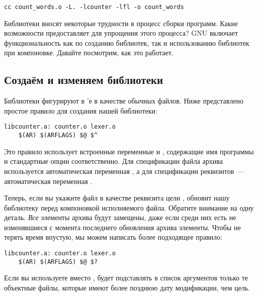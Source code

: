 {\footnotesize
\begin{verbatim}
cc count_words.o -L. -lcounter -lfl -o count_words
\end{verbatim}
}

Библиотеки вносят некоторые трудности в процесс сборки программ. Какие
возможности предоставляет \GNUmake{} для упрощения этого процесса? GNU
\GNUmake{} включает функциональность как по созданию библиотек, так и
использованию библиотек при компоновке. Давайте посмотрим, как это
работает.

\subsection{Создаём и изменяем библиотеки}

Библиотеки фигурируют в \Makefile{}'е в качестве обычных файлов. Ниже
представлено простое правило для создания нашей библиотеки:

{\footnotesize
\begin{verbatim}
libcounter.a: counter.o lexer.o
    $(AR) $(ARFLAGS) $@ $^
\end{verbatim}
}

Это правило использует встроенные переменные  и
, содержащие имя программы  и
стандартные опции  соответственно. Для спецификации файла
архива используется автоматическая переменная , а для
спецификации реквизитов~--- автоматическая переменная \variable{\$\^}.

Теперь, если вы укажите файл  в качестве
реквизита цели , \GNUmake{} обновит нашу
библиотеку перед компоновкой исполняемого файла. Обратите внимание на
одну деталь. \emph{Все} элементы архива будут замещены, даже если
среди них есть не изменявшиеся с момента последнего обновления архива
элементы. Чтобы не терять время впустую, мы можем написать более
подходящее правило:

{\footnotesize
\begin{verbatim}
libcounter.a: counter.o lexer.o
    $(AR) $(ARFLAGS) $@ $?
\end{verbatim}
}

Если вы используете  вместо \variable{\$\^},
\GNUmake{} будет подставлять в список аргументов только те объектные
файлы, которые имеют более позднюю дату модификации, чем цель.

